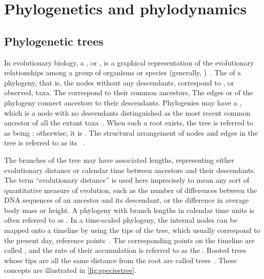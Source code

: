 \section{Phylogenetics and phylodynamics}
\label{sec:phylo}

\subsection{Phylogenetic trees}

In evolutionary biology, a , or , is a
graphical representation of the evolutionary relationships among a group of
organisms or species (generally, )~\autocite{haeckel1866generelle}.
The  of a phylogeny, that is, the nodes without any descendants,
correspond to , or observed, taxa. The 
correspond to their common ancestors,  The edges or  of the
phylogeny connect ancestors to their descendants. Phylogenies may have a
, which is a node with no descendants distinguished as the most
recent common ancestor of all the extant
taxa~\autocite{harding1971probabilities}. When such a root exists, the tree is
referred to as being ; otherwise, it is . The
structural arrangement of nodes and edges in the tree is referred to as its
~\autocite{cavalli1967phylogenetic}. 

The branches of the tree may have associated lengths, representing either
evolutionary distance or calendar time between ancestors and their descendants.
The term ``evolutionary distance'' is used here imprecisely to mean any sort of
quantitative measure of evolution, such as the number of differences between
the DNA sequences of an ancestor and its descendant, or the difference in
average body mass or height. A phylogeny with branch lengths in calendar time
units is often referred to as . In a time-scaled phylogeny,
the internal nodes can be mapped onto a timeline by using the tips of the tree,
which usually correspond to the present day, reference
points~\autocite{nee1992tempo}. The corresponding points on the timeline are
called , and the rate of their accumulation is referred
to as the . Rooted trees whose tips are all the same
distance from the root are called 
trees~\autocite{buneman1974note}. These concepts are illustrated in
\cref{fig:speciestree}.

